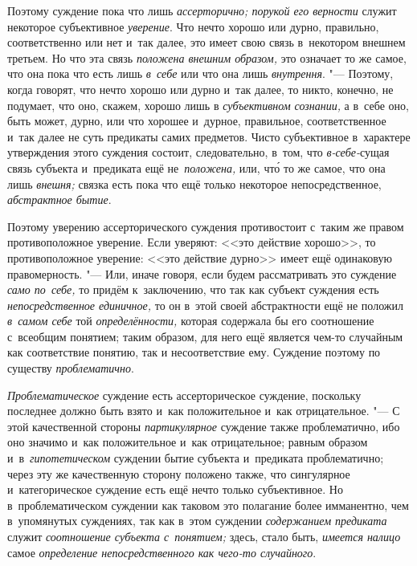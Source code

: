 Поэтому суждение пока что лишь {\em ассерторично; порукой его верности}
служит некоторое субъективное {\em уверение}. Что нечто
хорошо или дурно, правильно, соответственно или нет и~так далее, это имеет
свою связь в~некотором внешнем третьем. Но что эта связь
{\em положена внешним образом,}
это означает то же самое, что она пока что есть лишь
{\em в~себе} или что она лишь {\em внутрення}. "---
Поэтому, когда говорят, что нечто хорошо или дурно и~так
далее, то никто, конечно, не подумает, что оно, скажем, хорошо лишь в
{\em субъективном сознании,}
а в~себе оно, быть может, дурно, или что хорошее и~дурное,
правильное, соответственное и~так далее не суть предикаты самих предметов.
Чисто субъективное в~характере утверждения этого суждения состоит,
следовательно, в~том, что {\em в-себе-}сущая связь субъекта и~предиката ещё
не~{\em положена,} или, чт\'{о} то же самое, что она лишь {\em внешня;} связка
есть пока что ещё только некоторое непосредственное, {\em абстрактное бытие}.

Поэтому уверению ассерторического суждения противостоит с~таким
же правом противоположное уверение. Если уверяют: <<это действие
хорошо>>, то противоположное уверение: <<это действие дурно>> имеет ещё
одинаковую правомерность. "--- Или, иначе говоря, если будем
рассматривать это суждение {\em само по~себе,} то придём к~заключению, что
так как субъект суждения есть {\em непосредственное единичное,} то он в~этой
своей абстрактности ещё не положил {\em в~самом себе} той {\em определённости,}
которая содержала бы его соотношение с~всеобщим понятием; таким образом,
для него ещё является чем-то случайным как соответствие понятию, так и
несоответствие ему. Суждение поэтому по существу {\em проблематично}.


{\em Проблематическое} суждение есть ассерторическое суждение, поскольку
последнее должно быть взято и~как положительное и~как отрицательное. "---
С этой качественной стороны {\em партикулярное}
суждение также проблематично, ибо оно значимо и~как
положительное и~как отрицательное; равным образом и~в~{\em гипотетическом}
суждении бытие субъекта и~предиката проблематично; через эту
же качественную сторону положено также, что сингулярное и~категорическое
суждение есть ещё нечто только субъективное. Но в~проблематическом суждении
как таковом это полагание более имманентно, чем в~упомянутых суждениях, так
как в~этом суждении {\em содержанием предиката} служит {\em соотношение
субъекта с~понятием;} здесь, стало быть, {\em имеется налицо} самое
{\em определение непосредственного как чего-то случайного}.


